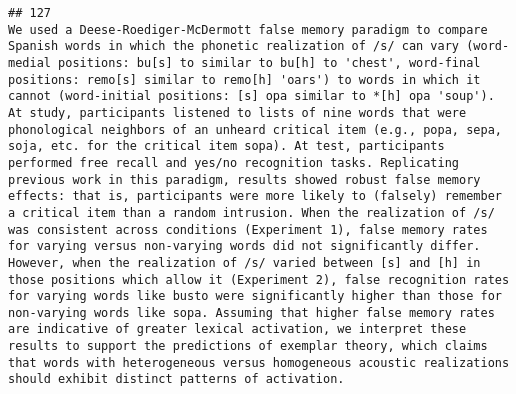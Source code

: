 \documentclass[
  english,
  man]{apa6}
\begin{document}
\begin{verbatim}
## 127                                                                                                                                                                                                                                                                                                                                                                                                                                                                                                                                                                                                                                                                                                                                                                                                                                                                                                                                                                                                                                                                                                                                          We used a Deese-Roediger-McDermott false memory paradigm to compare Spanish words in which the phonetic realization of /s/ can vary (word-medial positions: bu[s] to similar to bu[h] to 'chest', word-final positions: remo[s] similar to remo[h] 'oars') to words in which it cannot (word-initial positions: [s] opa similar to *[h] opa 'soup'). At study, participants listened to lists of nine words that were phonological neighbors of an unheard critical item (e.g., popa, sepa, soja, etc. for the critical item sopa). At test, participants performed free recall and yes/no recognition tasks. Replicating previous work in this paradigm, results showed robust false memory effects: that is, participants were more likely to (falsely) remember a critical item than a random intrusion. When the realization of /s/ was consistent across conditions (Experiment 1), false memory rates for varying versus non-varying words did not significantly differ. However, when the realization of /s/ varied between [s] and [h] in those positions which allow it (Experiment 2), false recognition rates for varying words like busto were significantly higher than those for non-varying words like sopa. Assuming that higher false memory rates are indicative of greater lexical activation, we interpret these results to support the predictions of exemplar theory, which claims that words with heterogeneous versus homogeneous acoustic realizations should exhibit distinct patterns of activation.

\end{verbatim}
\end{document}

